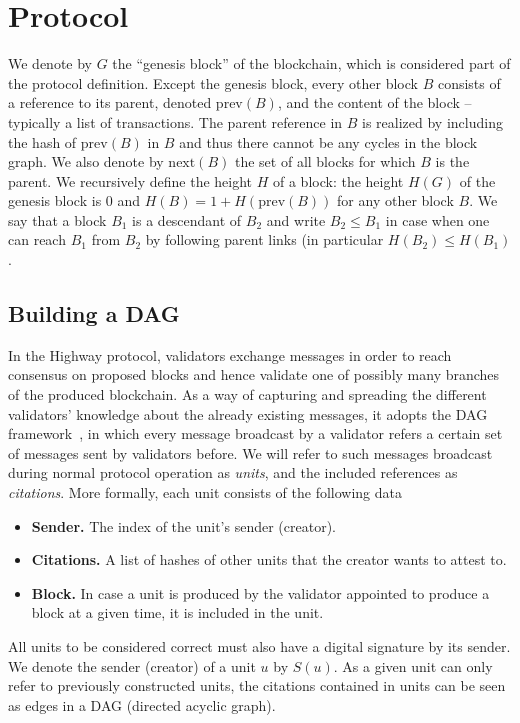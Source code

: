 \documentclass[12pt, fleqn]{article}
\begin{document}
\section{Protocol}
We denote by $G$ the ``genesis block'' of the blockchain, which is considered part of the protocol definition.
%
Except the genesis block, every other block $B$ consists of a reference to its parent, denoted $\mathrm{prev}(B)$, and the content of the block  -- typically a list of transactions.
%
The parent reference in $B$ is realized by including the hash of $\mathrm{prev}(B)$ in $B$ and thus there cannot be any cycles in the block graph.
%
We also denote by $\mathrm{next}(B)$ the set of all blocks for which $B$ is the parent.
%
We recursively define the height $H$ of a block: the height $H(G)$ of the genesis block is $0$ and $H(B)=1+H(\mathrm{prev}(B))$ for any other block $B$.
%
We say that a block $B_1$ is a descendant of $B_2$ and write $B_2\leq B_1$ in case when one can reach $B_1$ from $B_2$ by following parent links (in particular $H(B_2)\leq H(B_1)$.

\subsection{Building a DAG}

In the Highway protocol, validators exchange messages in order to reach consensus on proposed blocks and hence validate one of possibly many branches of the produced blockchain.
%
As a way of capturing and spreading the different validators' knowledge about the already existing messages, it adopts the DAG framework~\cite{moser1999byzantine,zamfir2018casper,baird2016hashgraph,GLSS19}, in which every message broadcast by a validator refers a certain set of  messages sent by validators before.
%
We will refer to such messages broadcast during normal protocol operation as \emph{units}, and the included references as \emph{citations}. More formally, each unit consists of the following data
\begin{itemize}
    \item {\bf Sender.} The index of the unit's sender (creator).
    \item {\bf Citations.} A list of hashes of other units that the creator wants to attest to. 
    \item {\bf Block.} In case a unit is produced by the validator appointed to produce a block at a given time, it is included in the unit. 
\end{itemize}

All units to be considered correct must also have a digital signature by its sender.
%
We denote the sender (creator) of a unit $u$ by $S(u)$.
%
As a given unit can only refer to previously constructed units, the citations contained in units can be seen as edges in a DAG (directed acyclic graph).
\end{document}

